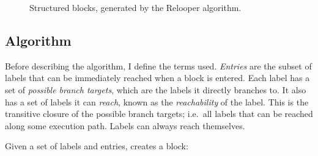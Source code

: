 \documentclass[00-main.tex]{subfiles}
\begin{document}
\begin{figure}[t]
  \centering
  \caption{Structured blocks, generated by the Relooper algorithm.}
  \label{fig:relooper output blocks structure} %
\end{figure}

\subsection{Algorithm}\label{sec:prep:relooper algorithm}

Before describing the algorithm, I define the terms used.
\emph{Entries} are the subset of labels that can be immediately reached when a block is entered.
Each label has a set of \emph{possible branch targets}, which are the labels it directly branches to.
It also has a set of labels it can \emph{reach}, known as the \emph{reachability} of the label.
This is the transitive closure of the possible branch targets; i.e.\ all labels that can be reached along some execution path.
Labels can always reach themselves.

Given a set of labels and entries,  creates a block:
\end{document}

